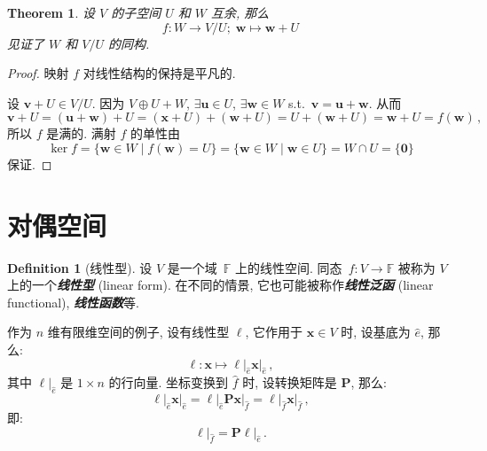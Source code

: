\documentclass[openany]{ctexbook}
\newcommand*{\indexbf}[1]{\emph{\textbf{#1}}\index{#1}} %
\theoremstyle{plain}
\newtheorem{theorem}{Theorem}[section] %
\theoremstyle{definition}
\newtheorem{definition}{Definition}[section] %
\newcommand*{\bv}{\boldsymbol} %
\newcommand*{\inbasis}[2]{\left.%
	{#1}\right|_{#2}
}
\begin{document}
\begin{theorem}
	设 $V$ 的子空间 $U$ 和 $W$ 互余, 那么
	\begin{equation*}
		f \colon W \to V / U; \; \bv w \mapsto \bv w + U
	\end{equation*}
	见证了 $W$ 和 $V / U$ 的同构.
\end{theorem}
\begin{proof}
	映射 $f$ 对线性结构的保持是平凡的. 
	
	设 $\bv v + U \in V / U$.
	因为 $V \oplus U + W$, $\exists \bv u \in U$, $\exists \bv w \in W$ s.t.\ $\bv v = \bv u + \bv w$. 从而
	\begin{equation*}
		\bv v + U 
		= (\bv u + \bv w) + U
		= (\bv x + U) + (\bv w + U)
		= U + (\bv w + U)
		= \bv w + U
		= f(\bv w)\,, 
	\end{equation*}
	所以 $f$ 是满的. 满射 $f$ 的单性由
	\begin{equation*}
		\ker f = \{\bv w \in W \mid f(\bv w) = U\} 
		= \{\bv w \in W \mid \bv w \in U\}
		= W \cap U
		= \{\bv 0\} 
	\end{equation*}
	保证.
\end{proof}

\section{对偶空间}
\begin{definition}[线性型]
	设 $V$ 是一个域~$\mathbb F$ 上的线性空间.
	同态~$f \colon V \to \mathbb F$ 被称为 $V$ 上的一个\indexbf{线性型} (linear form). 
	在不同的情景, 它也可能被称作\indexbf{线性泛函} (linear functional), \indexbf{线性函数}等.
\end{definition}

作为 $n$ 维有限维空间的例子, 设有线性型 $\ell$, 它作用于 $\bv x \in V$ 时, 设基底为 $\hat e$, 那么:
\begin{equation*}
	\ell \colon \bv x \mapsto \inbasis{\bv \ell}{\hat e} \inbasis{\bv x}{\hat e}\,,
\end{equation*}
其中 $\inbasis{\bv \ell}{\hat e}$ 是 $1 \times n$ 的行向量. 坐标变换到 $\hat f$ 时, 设转换矩阵是 $\bv P$, 那么:
\begin{equation*}
	\inbasis{\bv \ell}{\hat e} \inbasis{\bv x}{\hat e} 
	= \inbasis{\bv \ell}{\hat e} \bv P \inbasis{\bv x}{\hat f}
	= \inbasis{\bv \ell}{\hat f} \inbasis{\bv x}{\hat f}\,, 
\end{equation*}
即:
\begin{equation}
	\inbasis{\bv \ell}{\hat f} = \bv P \inbasis{\bv \ell}{\hat e}\,.
\end{equation}
\end{document}
